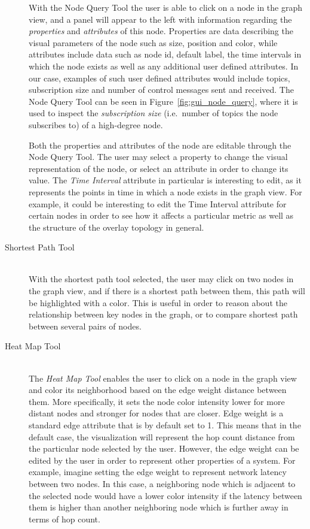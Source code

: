 \begin{description}
    With the Node Query Tool the user is able to click on a node in the
    graph view, and a panel will appear to the left with information
    regarding the \emph{properties} and \emph{attributes} of this node.
    Properties are data describing the visual parameters of the node
    such as size, position and color, while attributes include data such
    as node id, default label, the time intervals in which the node
    exists as well as any additional user defined attributes. In our
    case, examples of such user defined attributes would include topics,
    subscription size and number of control messages sent and received.
    The Node Query Tool can be seen in Figure~\ref{fig:gui_node_query},
    where it is used to inspect the \emph{subscription size} (i.e.\ number of
    topics the node subscribes to) of a high-degree node.

    Both the properties and attributes of the node are editable through
    the Node Query Tool. The user may select a property to change the
    visual representation of the node, or select an attribute in order
    to change its value. The \emph{Time Interval} attribute in
    particular is interesting to edit, as it represents the points in
    time in which a node exists in the graph view. For example, it could
    be interesting to edit the Time Interval attribute for certain
    nodes in order to see how it affects a particular metric as well as
    the structure of the overlay topology in general.

\item[Shortest Path Tool] \hfill \\

    With the shortest path tool selected, the user may click on two
    nodes in the graph view, and if there is a shortest path between
    them, this path will be highlighted with a color. This is useful in
    order to reason about the relationship between key nodes in the graph,
    or to compare shortest path between several pairs of nodes.

\item[Heat Map Tool] \hfill \\

    The \emph{Heat Map Tool} enables the user to click on a node in the
    graph view and color its neighborhood based on the edge weight distance between
    them. More specifically, it sets the node color intensity lower for more
    distant nodes and stronger for nodes that are closer. Edge weight is a
    standard edge attribute that is by default set to 1. This means that in
    the default case, the visualization will represent the hop count
    distance from the particular node selected by the user. However, the
    edge weight can be edited by the user in order to represent other
    properties of a system. For example, imagine setting the edge weight
    to represent network latency between two nodes. In this case, a
    neighboring node which is adjacent to the selected node would have a
    lower color intensity if the latency between them is higher than another
    neighboring node which is further away in terms of hop count.


\end{description}
